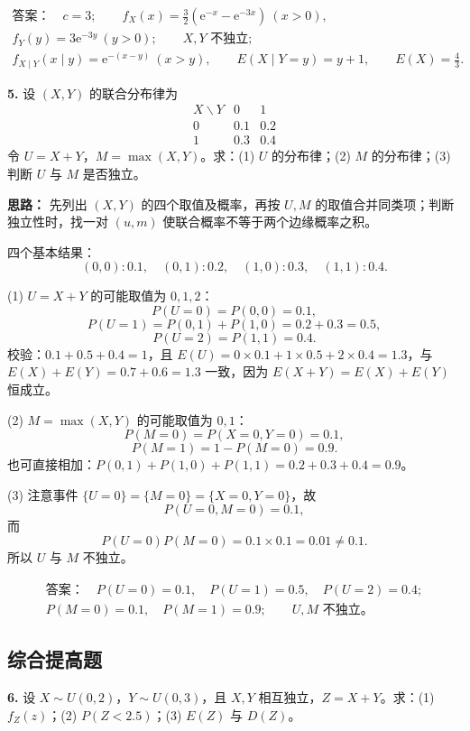 \[
\boxed{\begin{gathered}
\textbf{答案：}\quad c=3;\qquad
f_X(x)=\frac32\left(\mathrm e^{-x}-\mathrm e^{-3x}\right)\ (x>0),\\
f_Y(y)=3\mathrm e^{-3y}\ (y>0);\qquad X,Y\text{ 不独立};\\
f_{X\mid Y}(x\mid y)=\mathrm e^{-(x-y)}\ (x>y),\qquad E(X\mid Y=y)=y+1,\qquad E(X)=\frac43.
\end{gathered}}
\]

\else \answerarea[10] \fi%
\textbf{5.} 设 $(X,Y)$ 的联合分布律为
\[
\begin{array}{c|cc}
X\backslash Y & 0 & 1\\
\hline
0 & 0.1 & 0.2\\
1 & 0.3 & 0.4
\end{array}
\]
令 $U=X+Y$，$M=\max(X,Y)$。求：(1) $U$ 的分布律；(2) $M$ 的分布律；(3) 判断 $U$ 与 $M$ 是否独立。

\ifshowsolutions%
\textbf{思路：} 先列出 $(X,Y)$ 的四个取值及概率，再按 $U,M$ 的取值合并同类项；判断独立性时，找一对 $(u,m)$ 使联合概率不等于两个边缘概率之积。

四个基本结果：
\[
(0,0):0.1,\quad (0,1):0.2,\quad (1,0):0.3,\quad (1,1):0.4.
\]

(1) $U=X+Y$ 的可能取值为 $0,1,2$：
\[
P(U=0)=P(0,0)=0.1,
\]
\[
P(U=1)=P(0,1)+P(1,0)=0.2+0.3=0.5,
\]
\[
P(U=2)=P(1,1)=0.4.
\]
校验：$0.1+0.5+0.4=1$，且 $E(U)=0\times0.1+1\times0.5+2\times0.4=1.3$，与 $E(X)+E(Y)=0.7+0.6=1.3$ 一致，因为 $E(X+Y)=E(X)+E(Y)$ 恒成立。

(2) $M=\max(X,Y)$ 的可能取值为 $0,1$：
\[
P(M=0)=P(X=0,Y=0)=0.1,
\]
\[
P(M=1)=1-P(M=0)=0.9.
\]
也可直接相加：$P(0,1)+P(1,0)+P(1,1)=0.2+0.3+0.4=0.9$。

(3) 注意事件 $\{U=0\}=\{M=0\}=\{X=0,Y=0\}$，故
\[
P(U=0,M=0)=0.1,
\]
而
\[
P(U=0)P(M=0)=0.1\times0.1=0.01\neq0.1.
\]
所以 $U$ 与 $M$ 不独立。

\[
\boxed{\begin{gathered}
\textbf{答案：}\quad P(U=0)=0.1,\quad P(U=1)=0.5,\quad P(U=2)=0.4;\\
P(M=0)=0.1,\quad P(M=1)=0.9;\qquad U,M\text{ 不独立。}
\end{gathered}}
\]

\else \answerarea[10] \fi%

\subsection{综合提高题}
\textbf{6.} 设 $X\sim U(0,2)$，$Y\sim U(0,3)$，且 $X,Y$ 相互独立，$Z=X+Y$。求：(1) $f_Z(z)$；(2) $P(Z<2.5)$；(3) $E(Z)$ 与 $D(Z)$。


